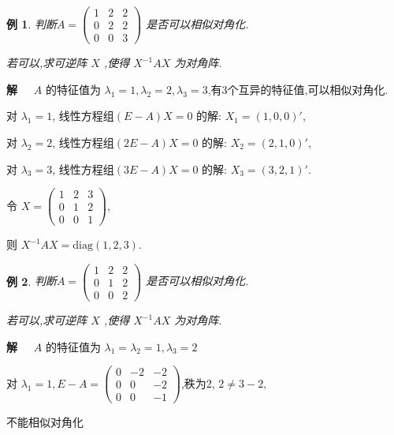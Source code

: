 \documentclass[13pt]{beamer}
\newtheorem{exa}{例}
\def\sol{{\bf 解~~ }}
\begin{document}
\begin{frame}
\begin{exa}
判断$A=\left(\begin{array}{ccc}1 & 2 & 2 \\ 0 & 2 & 2 \\ 0 & 0 & 3\end{array}\right)$
是否可以相似对角化.

若可以,求可逆阵 $X$ ,使得 $X^{-1} A X$ 为对角阵.
\end{exa}
\sol 
$A$ 的特征值为 $\lambda_{1}=1, \lambda_{2}=2, \lambda_{3}=3$,有3个互异的特征值,可以相似对角化.

对 $\lambda_{1}=1$, 线性方程组$(E-A) X=0$ 的解: $X_{1}=(1,0,0)'$,

对 $\lambda_{2}=2$, 线性方程组$(2 E-A) X=0$ 的解: $X_{2}=(2,1,0)'$,

对 $\lambda_{3}=3$, 线性方程组$(3 E-A) X=0$ 的解: $X_{3}=(3,2,1)'$. 

令 $X=\left(\begin{array}{ccc}1 & 2 & 3 \\ 0 & 1 & 2 \\ 0 & 0 & 1\end{array}\right)$,

则 
$X^{-1} A X=\mbox{diag}(1,2,3).$
\end{frame}

\begin{frame}
\begin{exa}
判断$A=\left(\begin{array}{ccc}1 & 2 & 2 \\ 0 & 1 & 2 \\ 0 & 0 & 2\end{array}\right)$
是否可以相似对角化.

若可以,求可逆阵 $X$ ,使得 $X^{-1} A X$ 为对角阵.
\end{exa}
\sol
$A$ 的特征值为 $\lambda_{1}=\lambda_{2}=1, \lambda_{3}=2$

对 $\lambda_{1}=1, E-A=\left(\begin{array}{ccc}0 & -2 & -2 \\ 0 & 0 & -2 \\ 0 & 0 & -1\end{array}\right)$,秩为2, $2 \neq 3-2,$ 

不能相似对角化
\end{frame}
\end{document}
